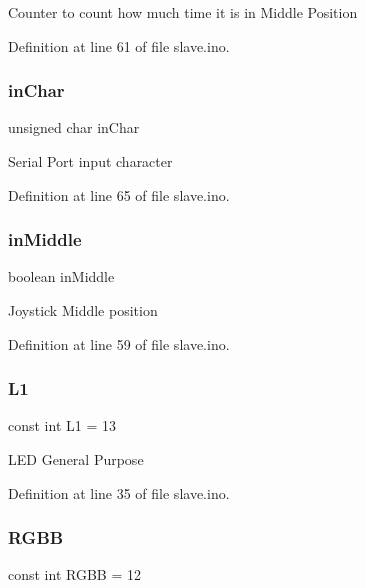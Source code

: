 Counter to count how much time it is in Middle Position 

Definition at line 61 of file slave.\+ino.

\mbox{\label{slave_8ino_a4d87cdc7ca3ca36af5abb2b043f14ade}} 
\subsubsection{\texorpdfstring{inChar}{inChar}}
{\footnotesize\ttfamily unsigned char in\+Char}

Serial Port input character 

Definition at line 65 of file slave.\+ino.

\mbox{\label{slave_8ino_a14307e34d72446f8de465828c44258c0}} 
\subsubsection{\texorpdfstring{inMiddle}{inMiddle}}
{\footnotesize\ttfamily boolean in\+Middle}

Joystick Middle position 

Definition at line 59 of file slave.\+ino.

\mbox{\label{slave_8ino_ad9dd51ba33ad54ebbfc73294ddcd5a4e}} 
\subsubsection{\texorpdfstring{L1}{L1}}
{\footnotesize\ttfamily const int L1 = 13}

L\+ED General Purpose 

Definition at line 35 of file slave.\+ino.

\mbox{\label{slave_8ino_a4e5fb0594384753481b5ec0cb2ae6002}} 
\subsubsection{\texorpdfstring{RGBB}{RGBB}}
{\footnotesize\ttfamily const int R\+G\+BB = 12}

